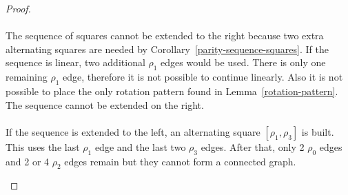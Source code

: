 \begin{proof}
\begin{figure}[H]
\begin{center}
\begin{tikzpicture}[scale=.8]
    \end{tikzpicture}
    \caption{}
    \label{proof-5-3}
  \end{center}
\end{figure}

\paragraph{}
The sequence of squares cannot be extended to the right because two extra alternating squares are needed by Corollary~\ref{parity-sequence-squares}. If the sequence is linear, two additional $\rho_1$ edges would be used. There is only one remaining $\rho_1$ edge, therefore it is not possible to continue linearly. Also it is not possible to place the only rotation pattern found in Lemma~\ref{rotation-pattern}. The sequence cannot be extended on the right.

\paragraph{}
If the sequence is extended to the left, an alternating square $[\rho_1, \rho_3]$ is built. This uses the last $\rho_1$ edge and the last two $\rho_3$ edges. After that, only 2 $\rho_0$ edges and 2 or 4 $\rho_2$ edges remain but they cannot form a connected graph.

\begin{figure}[H]
  \begin{center}
\end{center}
\end{figure}
\end{proof}
